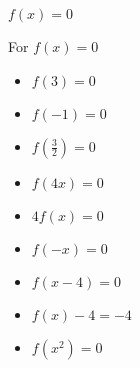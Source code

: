 {$f(x) = 0$}
{ For $f(x) = 0$ 

\begin{multicols}{2}
\begin{itemize}
\item $f(3) = 0$
\item $f(-1) =0$
\item $f\left(\frac{3}{2} \right) = 0$
\item  $f(4x) = 0$
\item $4f(x) = 0$
\item $f(-x) = 0$
\item  $f(x-4) = 0$ 
\item $f(x) - 4 = -4$
\item  $f\left(x^2\right) = 0$
\end{itemize}
\end{multicols}
}